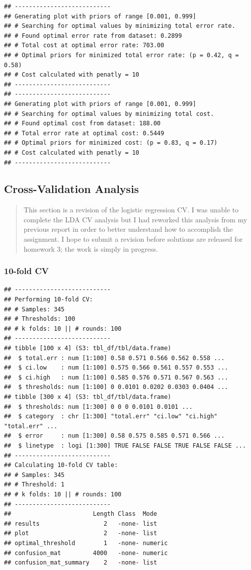 \documentclass[
  11pt,
  a4paper,
]{scrartcl}
\begin{document}
\begin{verbatim}
## ---------------------------
## Generating plot with priors of range [0.001, 0.999]
## # Searching for optimal values by minimizing total error rate.
## # Found optimal error rate from dataset: 0.2899
## # Total cost at optimal error rate: 703.00
## # Optimal priors for minimized total error rate: (p = 0.42, q = 0.58)
## # Cost calculated with penatly = 10
## ---------------------------
## ---------------------------
## Generating plot with priors of range [0.001, 0.999]
## # Searching for optimal values by minimizing total cost.
## # Found optimal cost from dataset: 188.00
## # Total error rate at optimal cost: 0.5449
## # Optimal priors for minimized cost: (p = 0.83, q = 0.17)
## # Cost calculated with penatly = 10
## ---------------------------
\end{verbatim}

\newpage

\hypertarget{cross-validation-analysis}{%
\subsection{Cross-Validation Analysis}\label{cross-validation-analysis}}

\begin{quote}
This section is a revision of the logistic regression CV. I was unable
to complete the LDA CV analysis but I had reworked this analysis from my
previous report in order to better understand how to accomplish the
assignment. I hope to submit a revision before solutions are released
for homework 3; the work is simply in progress.
\end{quote}

\hypertarget{fold-cv}{%
\subsubsection{10-fold CV}\label{fold-cv}}

\begin{verbatim}
## ---------------------------
## Performing 10-fold CV:
## # Samples: 345
## # Thresholds: 100
## # k folds: 10 || # rounds: 100
## ---------------------------
## tibble [100 x 4] (S3: tbl_df/tbl/data.frame)
##  $ total.err : num [1:100] 0.58 0.571 0.566 0.562 0.558 ...
##  $ ci.low    : num [1:100] 0.575 0.566 0.561 0.557 0.553 ...
##  $ ci.high   : num [1:100] 0.585 0.576 0.571 0.567 0.563 ...
##  $ thresholds: num [1:100] 0 0.0101 0.0202 0.0303 0.0404 ...
## tibble [300 x 4] (S3: tbl_df/tbl/data.frame)
##  $ thresholds: num [1:300] 0 0 0 0.0101 0.0101 ...
##  $ category  : chr [1:300] "total.err" "ci.low" "ci.high" "total.err" ...
##  $ error     : num [1:300] 0.58 0.575 0.585 0.571 0.566 ...
##  $ linetype  : logi [1:300] TRUE FALSE FALSE TRUE FALSE FALSE ...
## ---------------------------
## Calculating 10-fold CV table:
## # Samples: 345
## # Threshold: 1
## # k folds: 10 || # rounds: 100
## ---------------------------
##                       Length Class  Mode   
## results                  2   -none- list   
## plot                     2   -none- list   
## optimal_threshold        1   -none- numeric
## confusion_mat         4000   -none- numeric
## confusion_mat_summary    2   -none- list
\end{verbatim}
\end{document}
